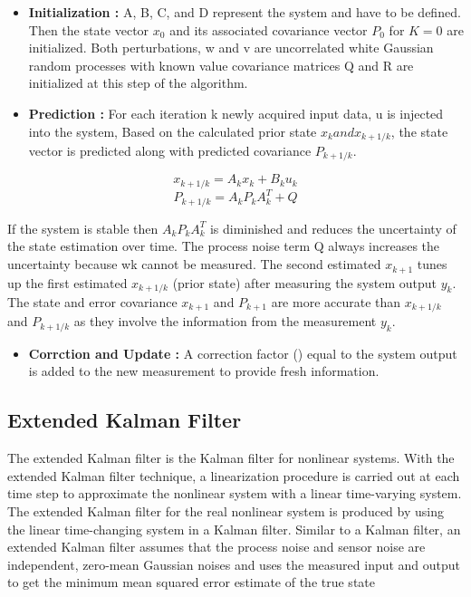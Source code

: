 \begin{itemize}
    \item \textbf{Initialization :}  A, B, C, and D represent the system and have to be defined. Then the state vector $x_0$ and its associated covariance vector $P_0$ for $K=0$ are initialized. Both perturbations, w and v are uncorrelated white Gaussian random processes with known value covariance matrices Q and R are initialized at this step of the algorithm.
    \item \textbf{Prediction :} For each iteration k newly acquired input data, u is injected into the system, Based on the calculated prior state $x_k and x_{k+1/k}$, the state vector is predicted along with predicted covariance $P_{k+1/k}$.
\end{itemize}

\begin{equation}\label{eq:Discrete_Prior_State_Equation}
    x_{k+1/k} = A_k x_k + B_k u_k 
\end{equation}
\begin{equation}\label{eq:Discrete_Prior_Covariance_Equation}
    P_{k+1/k} = A_k P_k A_k^{T} + Q
\end{equation}

If the system is stable then $A_k P_k A_k^{T}$ is diminished and reduces the uncertainty of the state estimation over time. The process noise term Q always increases the
uncertainty because wk cannot be measured. The second estimated $x_{k+1}$ tunes up the first estimated $x_{k+1/k}$ (prior state) after measuring the system output $y_k$. The state and error covariance $x_{k+1}$ and $P_{k+1}$
are more accurate than $x_{k+1/k}$ and $P_{k+1/k}$ as they involve the information from the measurement $y_k$.
\begin{itemize}
    \item \textbf{Corrction and Update :} A correction factor () equal to the system output is added to the new measurement to provide fresh information.
\end{itemize}

\subsection{Extended Kalman Filter }

The extended Kalman filter is the Kalman filter for nonlinear systems. With the extended Kalman filter technique, a linearization procedure is carried out at each time step to approximate the nonlinear system with a linear time-varying system. The extended Kalman filter for the real nonlinear system is produced by using the linear time-changing system in a Kalman filter. Similar to a Kalman filter, an extended Kalman filter assumes that the process noise and sensor noise are independent, zero-mean Gaussian noises and uses the measured input and output to get the minimum mean squared error estimate of the true state %

